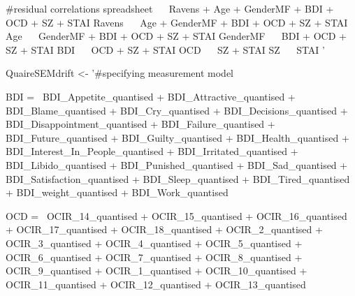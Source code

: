 \documentclass[]{article}
\newenvironment{Shaded}{\begin{snugshade}}{\end{snugshade}}
\newcommand{\StringTok}[1]{\textcolor[rgb]{0.31,0.60,0.02}{#1}}
\newcommand{\NormalTok}[1]{#1}
\begin{document}
\begin{Shaded}
\begin{Highlighting}[]
\StringTok{#residual correlations}
\StringTok{spreadsheet ~~ Ravens + Age + GenderMF + BDI + OCD + SZ + STAI}
\StringTok{Ravens ~~ Age  + GenderMF + BDI + OCD + SZ + STAI}
\StringTok{Age ~~  GenderMF + BDI + OCD + SZ + STAI}
\StringTok{GenderMF ~~ BDI + OCD + SZ + STAI}
\StringTok{BDI ~~ OCD + SZ + STAI}
\StringTok{OCD ~~ SZ + STAI}
\StringTok{SZ ~~ STAI}
\StringTok{'}

\NormalTok{QuaireSEMdrift <-}\StringTok{ '#specifying measurement model}

\StringTok{BDI =~ BDI_Appetite_quantised   + }
\StringTok{       BDI_Attractive_quantised + }
\StringTok{       BDI_Blame_quantised  + }
\StringTok{       BDI_Cry_quantised    +   }
\StringTok{       BDI_Decisions_quantised  +   }
\StringTok{       BDI_Disappointment_quantised +   }
\StringTok{       BDI_Failure_quantised    +   }
\StringTok{       BDI_Future_quantised +   }
\StringTok{       BDI_Guilty_quantised +   }
\StringTok{       BDI_Health_quantised +   }
\StringTok{       BDI_Interest_In_People_quantised +   }
\StringTok{       BDI_Irritated_quantised  +   }
\StringTok{       BDI_Libido_quantised +   }
\StringTok{       BDI_Punished_quantised   +   }
\StringTok{       BDI_Sad_quantised + }
\StringTok{       BDI_Satisfaction_quantised   +   }
\StringTok{       BDI_Sleep_quantised  +   }
\StringTok{       BDI_Tired_quantised  +   }
\StringTok{       BDI_weight_quantised +   }
\StringTok{       BDI_Work_quantised   }

\StringTok{OCD =~ OCIR_14_quantised    +   }
\StringTok{       OCIR_15_quantised    +   }
\StringTok{       OCIR_16_quantised    +   }
\StringTok{       OCIR_17_quantised    +   }
\StringTok{       OCIR_18_quantised    +   }
\StringTok{       OCIR_2_quantised +   }
\StringTok{       OCIR_3_quantised +   }
\StringTok{       OCIR_4_quantised +   }
\StringTok{       OCIR_5_quantised +   }
\StringTok{       OCIR_6_quantised +   }
\StringTok{       OCIR_7_quantised +   }
\StringTok{       OCIR_8_quantised +   }
\StringTok{       OCIR_9_quantised +   }
\StringTok{       OCIR_1_quantised +   }
\StringTok{       OCIR_10_quantised    +   }
\StringTok{       OCIR_11_quantised    +   }
\StringTok{       OCIR_12_quantised    +   }
\StringTok{       OCIR_13_quantised}


\end{Highlighting}
\end{Shaded}
\end{document}
